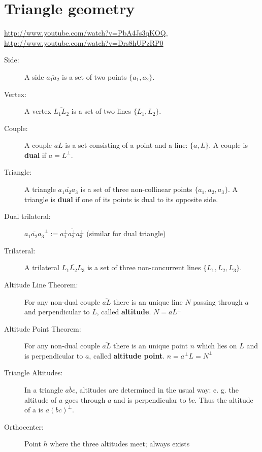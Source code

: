 \documentclass[DIV16,halfparskip]{scrartcl}
\begin{document}
\section{Triangle geometry}
\url{http://www.youtube.com/watch?v=PbA4Js3qKOQ}, \url{http://www.youtube.com/watch?v=Drs8hUPzRP0}

\begin{description}
    \item [Side:] A side $\overline{a_1a_2}$ is a set of two points $\{a_1,a_2\}$.

    \item [Vertex:] A vertex $\overline{L_1L_2}$ is a set of two lines
        $\{L_1,L_2\}$.

    \item [Couple:] A couple $\overline{aL}$ is a set consisting of a point and
        a line: $\{a, L\}$. A couple is \textbf{dual} if $a = L^\perp$.

    \item [Triangle:] A triangle $\overline{a_1a_2a_3}$ is a set of three
        non-collinear points $\{a_1, a_2, a_3\}$. A triangle is \textbf{dual}
        if one of its points is dual to its opposite side.

    \item [Dual trilateral:] $\overline{a_1a_2a_3}^\perp :=
        \overline{a_1^\perp a_2^\perp a_3^\perp}$ (similar for dual triangle)

    \item [Trilateral:] A trilateral $\overline{L_1L_2L_3}$ is a set of three
        non-concurrent lines $\{L_1, L_2, L_3\}$.

    \item [Altitude Line Theorem:] For any non-dual couple $\overline{aL}$
        there is an unique line $N$ passing through $a$ and perpendicular to
        $L$, called \textbf{altitude}. $N=aL^\perp$

    \item [Altitude Point Theorem:] For any non-dual couple $\overline{aL}$
        there is an unique point $n$ which lies on $L$ and is perpendicular to
        $a$, called \textbf{altitude point}. $n=a^\perp L = N^\perp$

    \item[Triangle Altitudes:] In a triangle $\overline{abc}$, altitudes are
        determined in the usual way: e. g. the altitude of $a$ goes through $a$
        and is perpendicular to $bc$. Thus the altitude of a is $a(bc)^\perp$.

    \item [Orthocenter:] Point $h$ where the three altitudes meet; always exists


\end{description}
\end{document}
